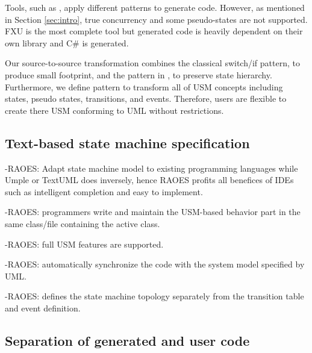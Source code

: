 Tools, such as \cite{ibm_rhapsody, sparxsystems_enterprise_2014}, apply different patterns to generate code. 
However, as mentioned in Section \ref{sec:intro}, true concurrency and some pseudo-states are not supported. 
FXU \cite{Pilitowski2007} is the most complete tool but generated code is heavily dependent on their own library and C\# is generated.

Our source-to-source transformation combines the classical switch/if pattern, to produce small footprint, and the pattern in \cite{niaz_mapping_2004}, to preserve state hierarchy.
Furthermore, we define pattern to transform all of USM concepts including states, pseudo states, transitions, and events.
Therefore, users are flexible to create there USM conforming to UML without restrictions.





\subsection{Text-based state machine specification}
-RAOES: Adapt state machine model to existing programming languages while Umple or TextUML does inversely, hence RAOES profits all benefices of IDEs such as intelligent completion and easy to implement. 

-RAOES: programmers write and maintain the USM-based behavior part in the same class/file containing the active class.

-RAOES: full USM features are supported.

-RAOES: automatically synchronize the code with the system model specified by UML.

-RAOES: defines the state machine topology separately from the transition table and event definition.

\subsection{Separation of generated and user code}
